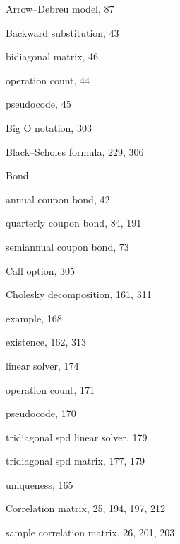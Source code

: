 {\parindent=0pt \parskip=0pt
\twocolumn

\noindent Arrow--Debreu model, 87

\medskip
\noindent Backward substitution, 43

\noindent\hspace*{1.4em}bidiagonal matrix, 46

\noindent\hspace*{1.4em}operation count, 44

\noindent\hspace*{1.4em}pseudocode, 45

\noindent Big O notation, 303

\noindent Black--Scholes formula, 229, 306

\noindent Bond

\noindent\hspace*{1.4em}annual coupon bond, 42

\noindent\hspace*{1.4em}quarterly coupon bond, 84, 191

\noindent\hspace*{1.4em}semiannual coupon bond, 73

\medskip
\noindent Call option, 305

\noindent Cholesky decomposition, 161, 311

\noindent\hspace*{1.4em}example, 168

\noindent\hspace*{1.4em}existence, 162, 313

\noindent\hspace*{1.4em}linear solver, 174

\noindent\hspace*{1.4em}operation count, 171

\noindent\hspace*{1.4em}pseudocode, 170

\noindent\hspace*{1.4em}tridiagonal spd linear solver, 179

\noindent\hspace*{1.4em}tridiagonal spd matrix, 177, 179

\noindent\hspace*{1.4em}uniqueness, 165

\noindent Correlation matrix, 25, 194, 197, 212

\noindent\hspace*{1.4em}sample correlation matrix, 26, 201, 203

}

